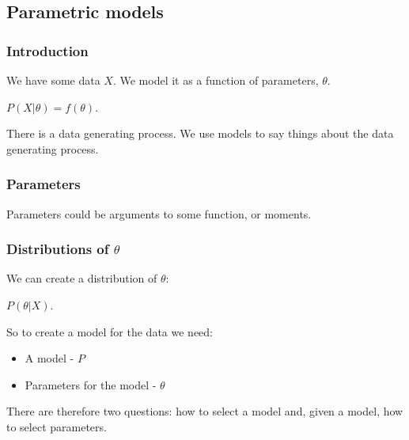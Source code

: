 
\subsection{Parametric models}

\subsubsection{Introduction}

We have some data \(X\). We model it as a function of parameters, \(\theta \).

\(P(X|\theta )=f(\theta )\).

There is a data generating process. We use models to say things about the data generating process.

\subsubsection{Parameters}

Parameters could be arguments to some function, or moments.

\subsubsection{Distributions of \(\theta \)}

We can create a distribution of \(\theta \):

\(P(\theta | X)\).

So to create a model for the data we need:

\begin{itemize}
\item A model - \(P\)
\item Parameters for the model - \(\theta \)
\end{itemize}

There are therefore two questions: how to select a model and, given a model, how to select parameters.

